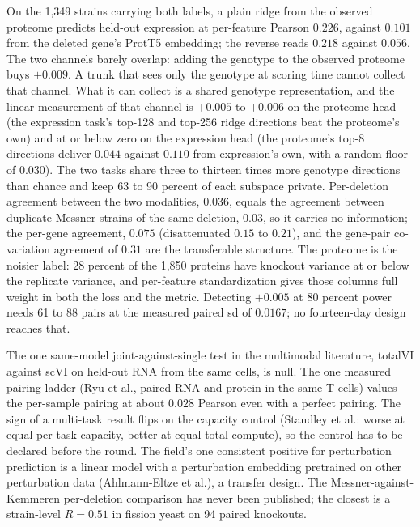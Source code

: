  On the 1,349 strains carrying both
labels, a plain ridge from the observed proteome predicts held-out expression at per-feature
Pearson $0.226$, against $0.101$ from the deleted gene's ProtT5 embedding; the reverse reads
$0.218$ against $0.056$. The two channels barely overlap: adding the genotype to the observed
proteome buys $+0.009$. A trunk that sees only the genotype at scoring time cannot collect that
channel. What it can collect is a shared genotype representation, and the linear measurement of
that channel is $+0.005$ to $+0.006$ on the proteome head (the expression task's top-128 and
top-256 ridge directions beat the proteome's own) and at or below zero on the expression head
(the proteome's top-8 directions deliver $0.044$ against $0.110$ from expression's own, with a
random floor of $0.030$). The two tasks share three to thirteen times more genotype directions
than chance and keep 63 to 90 percent of each subspace private. Per-deletion agreement between
the two modalities, $0.036$, equals the agreement between duplicate Messner strains of the
same deletion, $0.03$, so it carries no information; the per-gene agreement, $0.075$
(disattenuated $0.15$ to $0.21$), and the gene-pair co-variation agreement of $0.31$ are the
transferable structure. The proteome is the noisier label: 28 percent of the 1,850 proteins
have knockout variance at or below the replicate variance, and per-feature standardization
gives those columns full weight in both the loss and the metric. Detecting $+0.005$ at 80
percent power needs 61 to 88 pairs at the measured paired sd of $0.0167$; no fourteen-day
design reaches that.

 The one same-model joint-against-single test in the
multimodal literature, totalVI against scVI on held-out RNA from the same cells, is null. The
one measured pairing ladder (Ryu et al., paired RNA and protein in the same T cells) values the
per-sample pairing at about $0.028$ Pearson even with a perfect pairing. The sign of a
multi-task result flips on the capacity control (Standley et al.: worse at equal per-task
capacity, better at equal total compute), so the control has to be declared before the round.
The field's one consistent positive for perturbation prediction is a linear model with a
perturbation embedding pretrained on other perturbation data (Ahlmann-Eltze et al.), a transfer
design. The Messner-against-Kemmeren per-deletion comparison has never been published; the
closest is a strain-level $R = 0.51$ in fission yeast on 94 paired knockouts.


